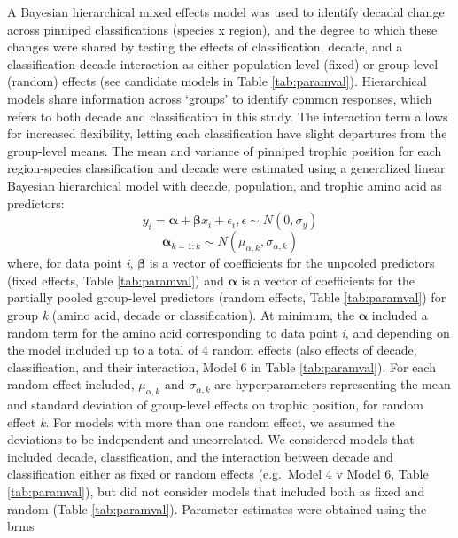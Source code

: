 \documentclass [11pt, proquest] {uwthesis}[2015/03/03]
\begin{document}
A Bayesian hierarchical mixed effects model was used to identify decadal
change across pinniped classifications (species x region), and the
degree to which these changes were shared by testing the effects of
classification, decade, and a classification-decade interaction as
either population-level (fixed) or group-level (random) effects (see
candidate models in Table \ref{tab:paramval}). Hierarchical models share
information across `groups' to identify common responses, which refers
to both decade and classification in this study. The interaction term
allows for increased flexibility, letting each classification have
slight departures from the group-level means. The mean and variance of
pinniped trophic position for each region-species classification and
decade were estimated using a generalized linear Bayesian hierarchical
model with decade, population, and trophic amino acid as predictors:
\begin{equation} 
y_i = \boldsymbol\alpha + \boldsymbol\beta x_i + \epsilon_i, \epsilon \sim N(0,\sigma_y)
  \label{eq:linsex}
\end{equation}
\begin{equation} 
\boldsymbol\alpha_{k=1:k} \sim N(\mu_{\alpha,k},\sigma_{\alpha,k})
  \label{eq:linsex}
\end{equation}
where, for data point \emph{i}, \(\boldsymbol\beta\) is a vector of
coefficients for the unpooled predictors (fixed effects, Table
\ref{tab:paramval}) and \(\boldsymbol\alpha\) is a vector of
coefficients for the partially pooled group-level predictors (random
effects, Table \ref{tab:paramval}) for group \emph{k} (amino acid,
decade or classification). At minimum, the \(\boldsymbol\alpha\)
included a random term for the amino acid corresponding to data point
\emph{i}, and depending on the model included up to a total of 4 random
effects (also effects of decade, classification, and their interaction,
Model 6 in Table \ref{tab:paramval}). For each random effect included,
\(\mu_{α,k}\) and \(\sigma_{α,k}\) are hyperparameters representing the
mean and standard deviation of group-level effects on trophic position,
for random effect \emph{k}. For models with more than one random effect,
we assumed the deviations to be independent and uncorrelated. We
considered models that included decade, classification, and the
interaction between decade and classification either as fixed or random
effects (e.g.~Model 4 v Model 6, Table \ref{tab:paramval}), but did not
consider models that included both as fixed and random (Table
\ref{tab:paramval}). Parameter estimates were obtained using the brms
\end{document}
